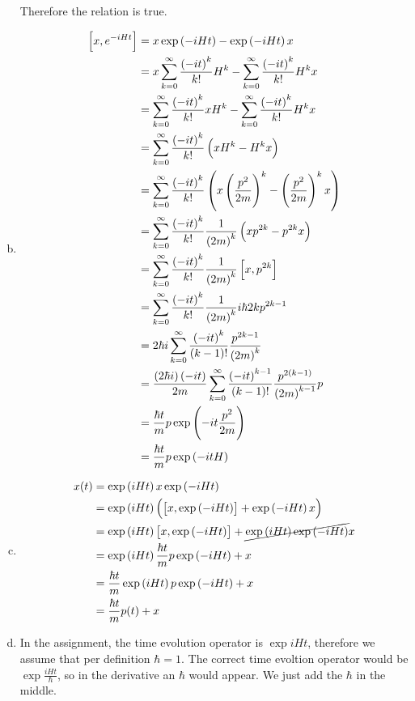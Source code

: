 \documentclass[a4paper,german,12pt,smallheadings]{scrartcl}
\begin{document}
\begin{enumerate}[a)]
    Therefore the relation is true.
  \item
    \begin{align*}
      \sbr{x, e^{-iHt}} &= x \exp\del{-iHt} - \exp\del{-iHt}x \\
                        &= x \sum_{k=0}^\infty \frac{\del{-it}^k}{k!} H^k - \sum_{k=0}^\infty \frac{\del{-it}^k}{k!} H^k x \\
                        &= \sum_{k=0}^\infty \frac{\del{-it}^k}{k!} xH^k - \sum_{k=0}^\infty \frac{\del{-it}^k}{k!} H^k x \\
                        &= \sum_{k=0}^\infty \frac{\del{-it}^k}{k!} \del{xH^k - H^kx} \\
                        &= \sum_{k=0}^\infty \frac{\del{-it}^k}{k!} \del{x \del{\frac{p^2}{2m}}^k - \del{\frac{p^2}{2m}}^k x} \\
                        &= \sum_{k=0}^\infty \frac{\del{-it}^k}{k!} \frac{1}{\del{2m}^k} \del{x p^{2k} - p^{2k} x} \\
                        &= \sum_{k=0}^\infty \frac{\del{-it}^k}{k!} \frac{1}{\del{2m}^k} \sbr{x,p^{2k}} \\
                        &= \sum_{k=0}^\infty \frac{\del{-it}^k}{k!} \frac{1}{\del{2m}^k} i \hbar 2k p^{2k-1} \\
                        &= 2 \hbar i \sum_{k=0}^\infty \frac{\del{-it}^k}{\del{k-1}!} \frac{p^{2k-1}}{\del{2m}^k} \\
                        &= \frac{\del{2 \hbar i}\del{-it}}{2m} \sum_{k=0}^\infty \frac{\del{-it}^{k-1}}{\del{k-1}!} \frac{p^{2(k-1)}}{\del{2m}^{k-1}} p \\
                        &= \frac{\hbar t}{m} p \exp\del{-it \frac{p^2}{2m}} \\
                        &= \frac{\hbar t}{m} p \exp\del{-it H}
    \end{align*}
  \item
    \begin{align*}
      x(t) &= \exp\del{iHt} x \exp\del{-iHt} \\
           &= \exp\del{iHt} \del{\sbr{x, \exp\del{-iHt}} + \exp\del{-iHt}x} \\
           &= \exp\del{iHt} \sbr{x, \exp\del{-iHt}} + \cancel{\exp\del{iHt}\exp\del{-iHt}}x \\
           &= \exp\del{iHt} \frac{\hbar t}{m} p \exp\del{-iHt} + x \\
           &= \frac{\hbar t}{m} \exp\del{iHt} p \exp\del{-iHt} + x \\
           &= \frac{\hbar t}{m} p(t) + x
    \end{align*}
  \item
    In the assignment, the time evolution operator is $\exp iHt$, therefore we
    assume that per definition $\hbar = 1$. The correct time evoltion operator would be
    $\exp \frac{iHt}{\hbar}$, so in the derivative an $\hbar$ would appear. We
    just add the $\hbar$ in the middle.


\end{enumerate}
\end{document}
